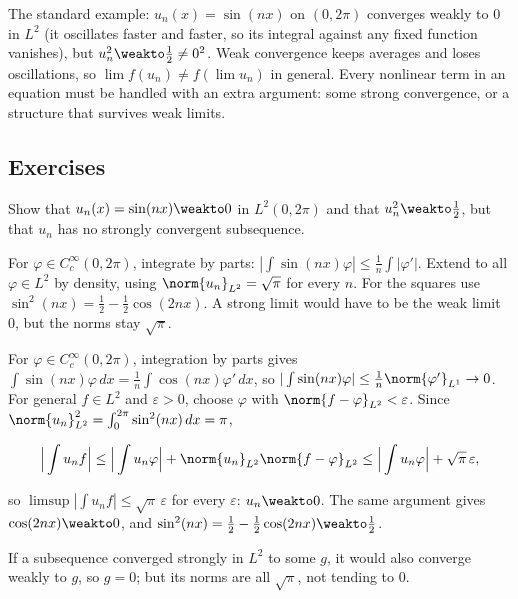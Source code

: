 The standard example: $u_n(x) = \sin(nx)$ on $(0,2\pi)$ converges weakly to $0$ in $L^2$ (it oscillates faster and faster, so its integral against any fixed function vanishes), but $u_n^2 \weakto \frac12 \ne 0^2$. Weak convergence keeps averages and loses oscillations, so $\lim f(u_n) \ne f(\lim u_n)$ in general. Every nonlinear term in an equation must be handled with an extra argument: some strong convergence, or a structure that survives weak limits.

\subsection*{Exercises}

\begin{exercise}
  Show that $u_n(x) = \sin(nx) \weakto 0$ in $L^2(0,2\pi)$ and that $u_n^2 \weakto \frac12$, but that $u_n$ has no strongly convergent subsequence.
  \begin{hint}
    For $\varphi \in C_c^\infty(0,2\pi)$, integrate by parts: $|\int \sin(nx)\varphi| \le \frac1n\int|\varphi'|$. Extend to all $\varphi \in L^2$ by density, using $\norm{u_n}_{L^2} = \sqrt\pi$ for every $n$. For the squares use $\sin^2(nx) = \frac12 - \frac12\cos(2nx)$. A strong limit would have to be the weak limit $0$, but the norms stay $\sqrt\pi$.
  \end{hint}
  \begin{solution}
    For $\varphi \in C_c^\infty(0,2\pi)$, integration by parts gives $\int \sin(nx)\varphi\,dx = \frac1n\int\cos(nx)\varphi'\,dx$, so $|\int\sin(nx)\varphi| \le \frac1n\norm{\varphi'}_{L^1} \to 0$. For general $f \in L^2$ and $\varepsilon > 0$, choose $\varphi$ with $\norm{f - \varphi}_{L^2} < \varepsilon$. Since $\norm{u_n}_{L^2}^2 = \int_0^{2\pi}\sin^2(nx)\,dx = \pi$,

    \[ \Big|\int u_n f\Big| \le \Big|\int u_n\varphi\Big| + \norm{u_n}_{L^2}\norm{f - \varphi}_{L^2} \le \Big|\int u_n\varphi\Big| + \sqrt\pi\,\varepsilon, \]

    so $\limsup|\int u_nf| \le \sqrt\pi\,\varepsilon$ for every $\varepsilon$: $u_n \weakto 0$. The same argument gives $\cos(2nx) \weakto 0$, and $\sin^2(nx) = \frac12 - \frac12\cos(2nx) \weakto \frac12$.

    If a subsequence converged strongly in $L^2$ to some $g$, it would also converge weakly to $g$, so $g = 0$; but its norms are all $\sqrt\pi$, not tending to $0$.
  \end{solution}
\end{exercise}

